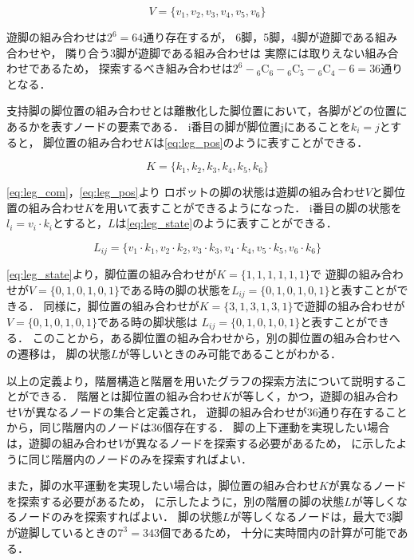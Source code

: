\begin{equation}\label{eq:leg_com}
  V = \{v_1, v_2, v_3, v_4, v_5, v_6\}
\end{equation}

\noindent 遊脚の組み合わせは$2^6 = 64$通り存在するが，
6脚，5脚，4脚が遊脚である組み合わせや，
隣り合う3脚が遊脚である組み合わせは
実際には取りえない組み合わせであるため，
探索するべき組み合わせは$2^6 - {}_6 \mathrm{C}_6 - {}_6 \mathrm{C}_5 - {}_6 \mathrm{C}_4 - 6 = 36$通りとなる．

支持脚の脚位置の組み合わせとは離散化した脚位置において，各脚がどの位置にあるかを表すノードの要素である．
i番目の脚が脚位置jにあることを$k_i = j$とすると，
脚位置の組み合わせ$K$は\eqref{eq:leg_pos}のように表すことができる．

\begin{equation}\label{eq:leg_pos}
  K = \{k_1, k_2, k_3, k_4, k_5, k_6\}
\end{equation}

\noindent\eqref{eq:leg_com}，\eqref{eq:leg_pos}より
ロボットの脚の状態は遊脚の組み合わせ$V$と脚位置の組み合わせ$K$を用いて表すことができるようになった．
i番目の脚の状態を$l_i = v_i \cdot k_i$とすると，$L$は\eqref{eq:leg_state}のように表すことができる．

\begin{equation}\label{eq:leg_state}
  L_{ij} = \{v_1 \cdot k_1, v_2 \cdot k_2, v_3 \cdot k_3, v_4 \cdot k_4, v_5 \cdot k_5, v_6 \cdot k_6\}
\end{equation}

\noindent\eqref{eq:leg_state}より，脚位置の組み合わせが$K = \{1,1,1,1,1,1\}$で
遊脚の組み合わせが$V = \{0,1,0,1,0,1\}$である時の脚の状態を$L_{ij} = \{0,1,0,1,0,1\}$と表すことができる．
同様に，脚位置の組み合わせが$K = \{3,1,3,1,3,1\}$で遊脚の組み合わせが$V = \{0,1,0,1,0,1\}$である時の脚状態は
$L_{ij} = \{0,1,0,1,0,1\}$と表すことができる．
このことから，ある脚位置の組み合わせから，別の脚位置の組み合わせへの遷移は，
脚の状態$L$が等しいときのみ可能であることがわかる．

以上の定義より，階層構造と階層を用いたグラフの探索方法について説明することができる．
階層とは脚位置の組み合わせ$K$が等しく，かつ，遊脚の組み合わせ$V$が異なるノードの集合と定義され，
遊脚の組み合わせが36通り存在することから，同じ階層内のノードは36個存在する．
脚の上下運動を実現したい場合は，遊脚の組み合わせ$V$が異なるノードを探索する必要があるため，
に示したように同じ階層内のノードのみを探索すればよい．

また，脚の水平運動を実現したい場合は，脚位置の組み合わせ$K$が異なるノードを探索する必要があるため，
に示したように，別の階層の脚の状態$L$が等しくなるノードのみを探索すればよい．
脚の状態$L$が等しくなるノードは，最大で3脚が遊脚しているときの$7^3 = 343$個であるため，
十分に実時間内の計算が可能である．

